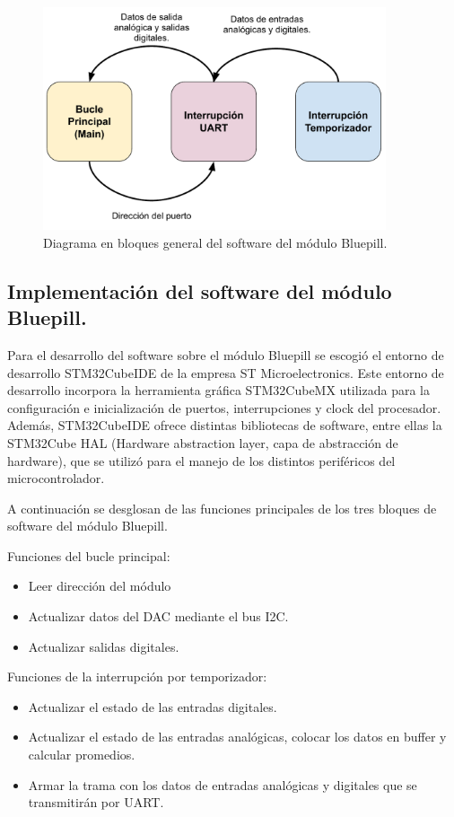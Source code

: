 \begin{figure}[H]
	\centering
	\includegraphics[width=0.9\textwidth]{./Figures/TareasSTM32.pdf}
	\caption{Diagrama en bloques general del software del módulo Bluepill.}
	\label{fig:TareasSTM32}
\end{figure}

\subsection{Implementación del software del módulo Bluepill.}
Para el desarrollo del software sobre el módulo Bluepill se escogió el entorno de desarrollo STM32CubeIDE de la empresa ST Microelectronics. Este entorno de desarrollo incorpora la herramienta gráfica STM32CubeMX utilizada para la configuración e inicialización de puertos, interrupciones y clock del procesador. Además, STM32CubeIDE ofrece distintas bibliotecas de software, entre ellas la STM32Cube HAL (Hardware abstraction layer, capa de abstracción de hardware), que se utilizó para el manejo de los distintos periféricos del microcontrolador.

A continuación se desglosan de las funciones principales de los tres bloques de software del módulo Bluepill.

Funciones del bucle principal:
\begin{itemize}
	\item Leer dirección del módulo
	\item Actualizar datos del DAC mediante el bus I2C.
	\item Actualizar salidas digitales.
\end{itemize}

Funciones de la interrupción por temporizador:
\begin{itemize}
	\item Actualizar el estado de las entradas digitales.
	\item Actualizar el estado de las entradas analógicas, colocar los datos en buffer y calcular promedios.
	\item Armar la trama con los datos de entradas analógicas y digitales que se transmitirán por UART.
\end{itemize}


